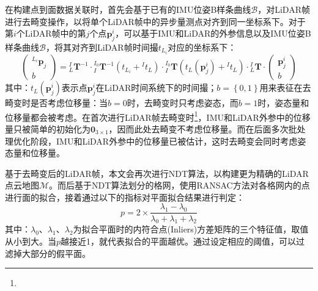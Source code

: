 在构建点到面数据关联时，首先会基于已有的IMU位姿B样条曲线$\mathcal{B}$，对LiDAR帧进行去畸变操作，以将单个LiDAR帧中的异步量测点对齐到同一坐标系下。对于第$i$个LiDAR帧中的第$j$个点$\boldsymbol{p}_j^i$，可以基于IMU和LiDAR的外参信息以及IMU位姿B样条曲线$\mathcal{B}$，将其对齐到LiDAR帧时间撮$t_{L_i}$对应的坐标系下：
\begin{equation}
  \begin{pmatrix}
    {^{L_i}}\boldsymbol{p}_j \\b
  \end{pmatrix}	={{^{I}_{L}}\boldsymbol{T}^{-1}}\cdot{{^{I_0}_{I}}\boldsymbol{T}^{-1}\left( t_{L_i}+{^{I}t_L}\right) }\cdot{{^{I_0}_{I}}\boldsymbol{T}\left( t_{L}(\boldsymbol{p}_j^i)+{^{I}t_L}\right) }\cdot{{^{I}_{L}}\boldsymbol{T}}\cdot		\begin{pmatrix}
    \boldsymbol{p}_j^i \\b
  \end{pmatrix}
\end{equation}
其中：$t_{L}(\boldsymbol{p}_j^i)$表示点$\boldsymbol{p}_j^i$在LiDAR时间系统下的时间撮；$b=\left\lbrace 0,1\right\rbrace $用来表征在去畸变时是否考虑位移量：当$b=0$时，去畸变时只考虑姿态，而$b=1$时，姿态量和位移量都会被考虑。在首次进行LiDAR帧去畸变时\footnote{}，IMU和LiDAR外参中的位移量只被简单的初始化为$\boldsymbol{0}_{3\times 1}$，因而此处去畸变不考虑位移量。而在后面多次批处理优化阶段，IMU和LiDAR外参中的位移量已被估计，这时去畸变会同时考虑姿态量和位移量。

基于去畸变后的LiDAR帧，本文会再次进行NDT算法，以构建更为精确的LiDAR点云地图$\mathcal{M}$。而后基于NDT算法划分的格网，使用RANSAC方法\cite{barfoot2017state}对各格网内的点进行面的拟合，接着通过以下的指标对平面拟合结果进行判定：
\begin{equation}
  p=2\times\frac{\lambda_1-\lambda_0}{\lambda_0+\lambda_1+\lambda_2}
\end{equation}
其中：$\lambda_0$、$\lambda_1$、$\lambda_2$为拟合平面时的内符合点(Inliers)方差矩阵的三个特征值，取值从小到大。当$p$越接近1，就代表拟合的平面越优。通过设定相应的阈值，可以过滤掉大部分的假平面。

